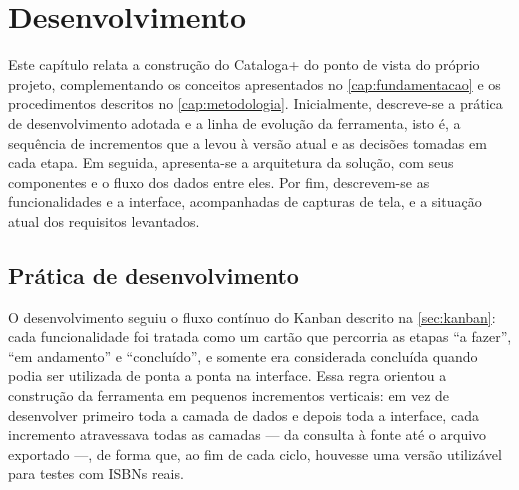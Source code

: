 %
%
%

\chapter{Desenvolvimento}
\label{cap:desenvolvimento}

Este capítulo relata a construção do Cataloga+ do ponto de vista do próprio projeto, complementando os conceitos apresentados no \autoref{cap:fundamentacao} e os procedimentos descritos no \autoref{cap:metodologia}. Inicialmente, descreve-se a prática de desenvolvimento adotada e a linha de evolução da ferramenta, isto é, a sequência de incrementos que a levou à versão atual e as decisões tomadas em cada etapa. Em seguida, apresenta-se a arquitetura da solução, com seus componentes e o fluxo dos dados entre eles. Por fim, descrevem-se as funcionalidades e a interface, acompanhadas de capturas de tela, e a situação atual dos requisitos levantados.

\section{Prática de desenvolvimento}
\label{sec:pratica}

O desenvolvimento seguiu o fluxo contínuo do Kanban descrito na \autoref{sec:kanban}: cada funcionalidade foi tratada como um cartão que percorria as etapas ``a fazer'', ``em andamento'' e ``concluído'', e somente era considerada concluída quando podia ser utilizada de ponta a ponta na interface. Essa regra orientou a construção da ferramenta em pequenos incrementos verticais: em vez de desenvolver primeiro toda a camada de dados e depois toda a interface, cada incremento atravessava todas as camadas --- da consulta à fonte até o arquivo exportado ---, de forma que, ao fim de cada ciclo, houvesse uma versão utilizável para testes com ISBNs reais.

